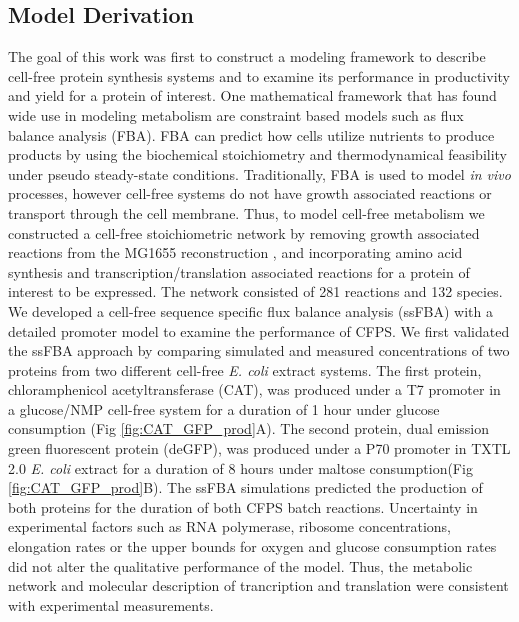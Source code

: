 \documentclass[journal=asbcd6,manuscript=article]{achemso}
\begin{document}
\subsection{Model Derivation}
The goal of this work was first to construct a modeling framework to describe cell-free protein synthesis systems and to examine its performance in productivity and yield for a protein of interest.
One mathematical framework that has found wide use in modeling metabolism are constraint based models such as flux balance analysis (FBA).
FBA can predict how cells utilize nutrients to produce products by using the biochemical stoichiometry and thermodynamical feasibility under pseudo steady-state conditions.
Traditionally, FBA is used to model \textit{in vivo} processes, however cell-free systems do not have growth associated reactions or transport through the cell membrane.
Thus, to model cell-free metabolism we constructed a cell-free stoichiometric network by removing growth associated reactions from the MG1655 reconstruction \cite{Feist:2007aa}, and incorporating amino acid synthesis and transcription/translation associated reactions \cite{Allen:2003aa} for a protein of interest to be expressed.
The network consisted of 281 reactions and 132 species.
We developed a cell-free sequence specific flux balance analysis (ssFBA) with a detailed promoter model \cite{Moon:2012aa} to examine the performance of CFPS.
We first validated the ssFBA approach by comparing simulated and measured concentrations of two proteins from two different cell-free \textit{E. coli} extract systems.
The first protein, chloramphenicol acetyltransferase (CAT), was produced under a T7 promoter in a glucose/NMP cell-free system \cite{2005_calhoun_BiotechnologyProgress} for a duration of 1 hour under glucose consumption (Fig \ref{fig:CAT_GFP_prod}A).
The second protein, dual emission green fluorescent protein (deGFP), was produced under a P70 promoter in TXTL 2.0 \textit{E. coli} extract for a duration of 8 hours under maltose consumption(Fig \ref{fig:CAT_GFP_prod}B).
The ssFBA simulations predicted the production of both proteins for the duration of both CFPS batch reactions.
Uncertainty in experimental factors such as RNA polymerase, ribosome concentrations, elongation rates or the upper bounds for oxygen and glucose consumption rates did not alter the qualitative performance of the model.
Thus, the metabolic network and molecular description of trancription and translation were consistent with experimental measurements.
\end{document}
